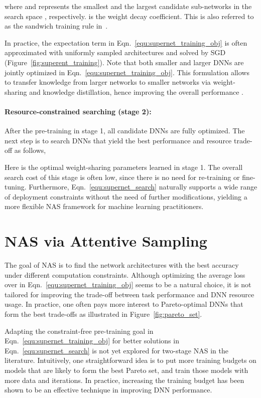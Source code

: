 \documentclass[final]{cvpr}
\theoremstyle{definition}
\begin{document}
where  and  represents the smallest and the largest candidate sub-networks in the search space , respectively.  is the weight decay coefficient. 
This is also referred to as the sandwich training rule in~\cite{yu2020bignas}. 

In practice, 
the expectation term in Eqn.~\eqref{equ:supernet_training_obj} is often approximated with  uniformly sampled architectures and solved by SGD (Figure~\ref{fig:superent_training}). 
Note that both smaller and larger DNNs are jointly optimized in Eqn.~\eqref{equ:supernet_training_obj}. 
This formulation allows to transfer knowledge from larger networks to smaller networks via weight-sharing and knowledge distillation,
hence improving the overall performance \cite{yu2020bignas, cai2019once}.


\paragraph{Resource-constrained searching (stage 2):}
After the pre-training in stage 1,
all candidate DNNs are fully optimized.
The next step is to search DNNs that yield
the best performance and resource trade-off as follows,

Here  is the optimal weight-sharing parameters learned in stage 1. 
The overall search cost of this stage is often low, 
since there is no need for re-training or fine-tuning.  
Furthermore, Eqn.~\eqref{equ:supernet_search} naturally supports a wide range of deployment constraints without the need of further modifications, yielding a more flexible NAS framework for machine learning practitioners. 


 
\section{NAS via Attentive Sampling}
The goal of NAS is to find the network architectures with the best accuracy under different computation constraints.
Although optimizing the average loss over  in Eqn.~\eqref{equ:supernet_training_obj} seems to be a natural choice,
it is not tailored for improving the trade-off between task performance and DNN resource usage. 
In practice, one often pays more interest to Pareto-optimal DNNs 
that form the best trade-offs as illustrated in Figure~\ref{fig:pareto_set}.

Adapting the constraint-free pre-training goal in Eqn.~\eqref{equ:supernet_training_obj} for better solutions in Eqn.~\eqref{equ:supernet_search} is not yet explored for two-stage NAS in the literature. Intuitively, 
one straightforward idea is to put more training budgets on models that are likely to form the best Pareto set, and train those models with more data and iterations. 
In practice, increasing the training budget has been
shown to be an effective technique in improving DNN performance.
\end{document}
